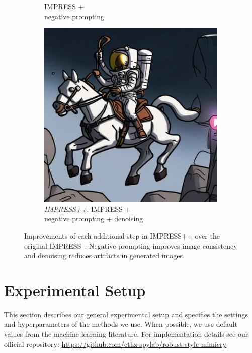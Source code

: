 \documentclass{article}
\newcommand{\repo}{\url{https://github.com/ethz-spylab/robust-style-mimicry}}
\begin{document}
\begin{figure}[h]
\begin{subfigure}{0.3\textwidth}
    \caption{IMPRESS +\\negative prompting}
    \end{subfigure}
    \hfill
    \begin{subfigure}{0.3\textwidth}
    \centering
    \includegraphics[width=\textwidth]{plots/impressplus/antidb_nulevoy_impress_negprompt_img2img.jpeg}
    \caption{\emph{IMPRESS++}. IMPRESS +\\negative prompting + denoising}
    \end{subfigure}
    \hfill
    \caption{Improvements of each additional step in IMPRESS++ over the original IMPRESS~\citep{impress}. Negative prompting improves image consistency and denoising reduces artifacts in generated images.}
    \label{fig:impress}
\end{figure}


\section{Experimental Setup}
\label{ap:experimentalsetup}

This section describes our general experimental setup and specifies the settings and hyperparameters of the methods we use. When possible, we use default values from the machine learning literature. For implementation details see our official repository: \repo
\end{document}
